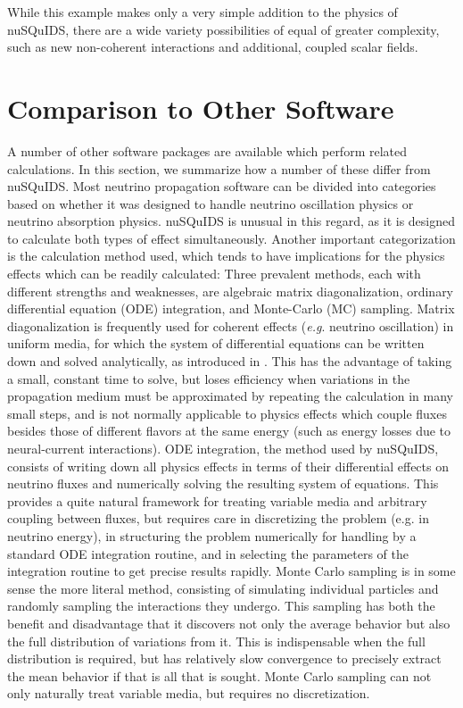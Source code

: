 \documentclass[3p,12pt]{elsarticle}
\newcommand{\ttf}{\ttfamily}
\begin{document}
While this example makes only a very simple addition to the physics of {\ttf nuSQuIDS}, there are a wide variety possibilities of equal of greater complexity, such as new non-coherent interactions and additional, coupled scalar fields. 

\section{Comparison to Other Software}
\label{sec:comparison}

A number of other software packages are available which perform related calculations. 
In this section, we summarize how a number of these differ from {\ttf nuSQuIDS}. 
Most neutrino propagation software can be divided into categories based on whether it was designed to handle neutrino oscillation physics or neutrino absorption physics. 
{\ttf nuSQuIDS} is unusual in this regard, as it is designed to calculate both types of effect simultaneously. 
Another important categorization is the calculation method used, which tends to have implications for the physics effects which can be readily calculated: 
Three prevalent methods, each with different strengths and weaknesses, are algebraic matrix diagonalization, ordinary differential equation (ODE) integration, and Monte-Carlo (MC) sampling. 
Matrix diagonalization is frequently used for coherent effects (\textit{e.g}. neutrino oscillation) in uniform media, for which the system of differential equations can be written down and solved analytically, as introduced in \cite{barger1980matter}. 
This has the advantage of taking a small, constant time to solve, but loses efficiency when variations in the propagation medium must be approximated by repeating the calculation in many small steps, and is not normally applicable to physics effects which couple fluxes besides those of different flavors at the same energy (such as energy losses due to neural-current interactions). 
ODE integration, the method used by {\ttf nuSQuIDS}, consists of writing down all physics effects in terms of their differential effects on neutrino fluxes and numerically solving the resulting system of equations. 
This provides a quite natural framework for treating variable media and arbitrary coupling between fluxes, but requires care in discretizing the problem (e.g. in neutrino energy), in structuring the problem numerically for handling by a standard ODE integration routine, and in selecting the parameters of the integration routine to get precise results rapidly. 
Monte Carlo sampling is in some sense the more literal method, consisting of simulating individual particles and randomly sampling the interactions they undergo. 
This sampling has both the benefit and disadvantage that it discovers not only the average behavior but also the full distribution of variations from it. 
This is indispensable when the full distribution is required, but has relatively slow convergence to precisely extract the mean behavior if that is all that is sought. 
Monte Carlo sampling can not only naturally treat variable media, but requires no discretization. 
\end{document}

